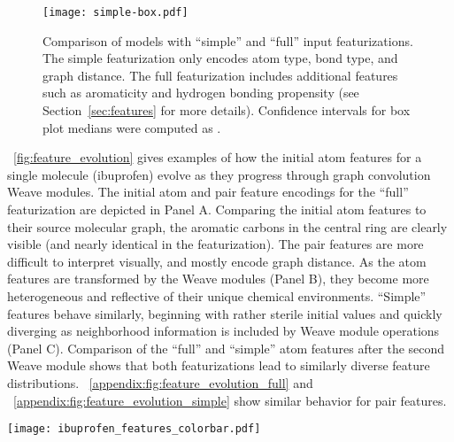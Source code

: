 \begin{figure}[tb]
\centering
  \texttt{[image: simple-box.pdf]}
  \caption{
    Comparison of models with ``simple'' and ``full'' input featurizations. The
    simple featurization only encodes atom type, bond type, and graph distance.
    The full featurization includes additional features such as aromaticity and
    hydrogen bonding propensity (see Section~\ref{sec:features} for more
    details). Confidence intervals for box plot medians were computed as
     \citep{mcgill1978variations}.
  }
  \label{fig:simple_features}
\end{figure}

\figurename~\ref{fig:feature_evolution} gives examples of how the initial atom
features for a single molecule (ibuprofen) evolve as they progress through graph
convolution Weave modules. The initial atom and pair feature encodings for the
``full'' featurization are depicted in Panel A. Comparing the initial atom
features to their source molecular graph, the aromatic carbons in the central
ring are clearly visible (and nearly identical in the featurization). The pair
features are more difficult to interpret visually, and mostly encode graph
distance. As the atom features are transformed by the Weave modules (Panel B),
they become more heterogeneous and reflective of their unique chemical
environments. ``Simple'' features behave similarly, beginning with rather
sterile initial values and quickly diverging as neighborhood information is
included by Weave module operations (Panel C). Comparison of the ``full'' and
``simple'' atom features after the second Weave module shows that both
featurizations lead to similarly diverse feature distributions.
\figurename~\ref{appendix:fig:feature_evolution_full} and
\figurename~\ref{appendix:fig:feature_evolution_simple} show similar behavior
for pair features.

\begin{figure*}[tb]
\centering
  \texttt{[image: ibuprofen\_features\_colorbar.pdf]}
  \caption{
    Graph convolution feature evolution. Atoms or pairs are
    displayed on the -axis and the dimensions of the feature vectors are on
    the -axis. (A) Conversion of the molecular graph
    for ibuprofen into atom and (unique) atom pair features. (B) Evolution of
    atom features after successive Weave modules in a graph convolution model
    with a WN architecture and depth 50 convolutions in Weave modules.
    (C) Evolution of ``simple'' atom features (see
    Section~\ref{sec:simple_features}) starting from initial encoding and
    progressing through the Weave modules of a WN architecture. The
    color bar applies to all panels.
  }
  \label{fig:feature_evolution}
\end{figure*}

